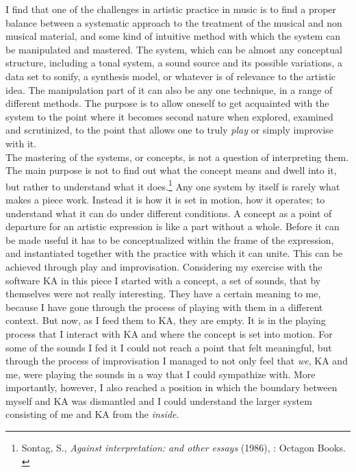 \documentclass[11pt]{article}
\begin{document}
I find that one of the challenges in artistic practice in music is to find a proper balance between a systematic approach to the treatment of the musical and non musical material, and some kind of intuitive method with which the system can be manipulated and mastered. The system, which can be almost any conceptual structure, including a tonal system, a sound source and its possible variations, a data set to sonify, a synthesis model, or whatever is of relevance to the artistic idea. The manipulation part of it can also be any one technique, in a range of different methods. The purpose is to allow oneself to get acquainted with the system to the point where it becomes second nature when explored, examined and scrutinized, to the point that allows one to truly \emph{play} or simply improvise with it.\\

The mastering of the systems, or concepts, is not a question of interpreting them. The main purpose is not to find out what the concept means and dwell into it, but rather to understand what it does.\footnote{Sontag, S., \emph{Against interpretation: and other essays} (1986), : Octagon Books.\\} Any one system by itself is rarely what makes a piece work. Instead it is how it is set in motion, how it operates; to understand what it can do under different conditions. A concept as a point of departure for an artistic expression is like a part without a whole. Before it can be made useful it has to be conceptualized within the frame of the expression, and instantiated together with the practice with which it can unite. This can be achieved through play and improvisation. Considering my exercise with the software KA in this piece I started with a concept, a set of sounds, that by themselves were not really interesting. They have a certain meaning to me, because I have gone through the process of playing with them in a different context. But now, as I feed them to KA, they are empty. It is in the playing process that I interact with KA and where the concept is set into motion. For some of the sounds I fed it I could not reach a point that felt meaningful, but through the process of improvisation I managed to not only feel that \emph{we}, KA and me, were playing the sounds in a way that I could sympathize with. More importantly, however, I also reached a position in which the boundary between myself and KA was dismantled and I could understand the larger system consisting of me and KA from the \emph{inside}.\\
\end{document}
